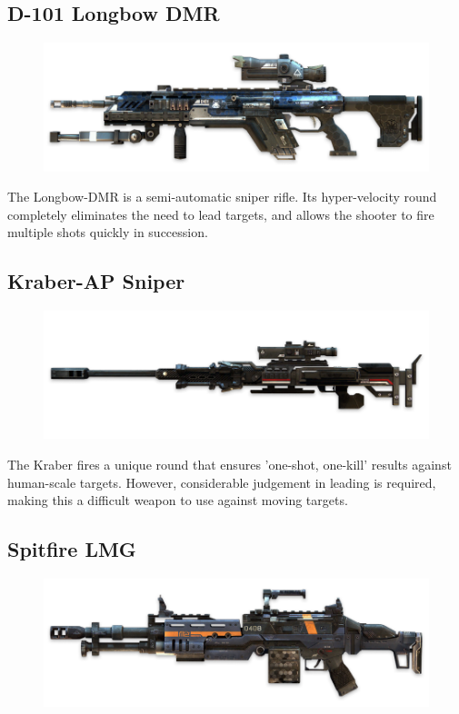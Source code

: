 \documentclass[9pt, openany]{extbook}
\begin{document}
\subsection{D-101 Longbow DMR}
\begin{figure}
\vspace*{-2em}
\includegraphics[width=\linewidth]{LongbowDMRSniper}
\end{figure}

The Longbow-DMR is a semi-automatic sniper rifle. Its hyper-velocity round completely eliminates the need to lead targets, and allows the shooter to fire multiple shots quickly in succession.


\subsection{Kraber-AP Sniper}
\begin{figure}
\vspace*{-2em}
\includegraphics[width=\linewidth]{KraberAPSniper}
\end{figure}

The Kraber fires a unique round that ensures 'one-shot, one-kill' results against human-scale targets. However, considerable judgement in leading is required, making this a difficult weapon to use against moving targets.

\subsection{Spitfire LMG}
\begin{figure}
\vspace*{-2em}
\includegraphics[width=\linewidth]{SpitfireLMG}
\end{figure}
\end{document}
